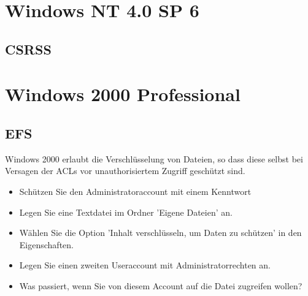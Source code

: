 \section{Windows NT 4.0 SP 6}

	\subsection{CSRSS}

\section{Windows 2000 Professional}


	\subsection{EFS}

	Windows 2000 erlaubt die Verschlüsselung von Dateien, so dass diese selbst bei Versagen der ACLs vor unauthorisiertem Zugriff geschützt sind.

	\begin{itemize}
		\item Schützen Sie den Administratoraccount mit einem Kenntwort 
		\item Legen Sie eine Textdatei im Ordner 'Eigene Dateien' an.
		\item Wählen Sie die Option 'Inhalt verschlüsseln, um Daten zu schützen' in den Eigenschaften.
		\item Legen Sie einen zweiten Useraccount mit Administratorrechten an.
		\item Was passiert, wenn Sie von diesem Account auf die Datei zugreifen wollen?
	\end{itemize}

